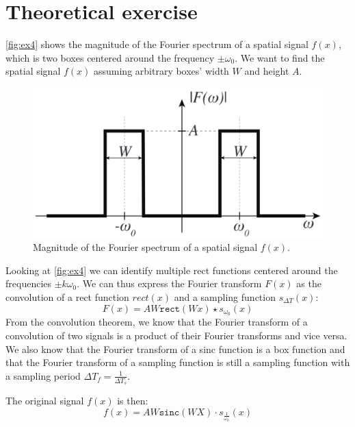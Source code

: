 \documentclass[tikz,14pt,fleqn]{article}
\begin{document}
\section{Theoretical exercise}
\autoref{fig:ex4} shows the magnitude of the Fourier spectrum of a spatial signal $f(x)$, which is two boxes centered around the frequency $±\omega_0$. We want to find the spatial signal $f(x)$ assuming arbitrary boxes' width $W$ and height $A$.

\begin{figure}[H]
    \centering
    \includegraphics[width=0.4\linewidth]{fig/4.plot.png}
    \caption{Magnitude of the Fourier spectrum of a spatial signal $f(x)$.}
    \label{fig:ex4}
\end{figure}


Looking at \autoref{fig:ex4} we can identify multiple rect functions centered around the frequencies $±k\omega_0$. We can thus express the Fourier transform $F(x)$ as the convolution of a rect function $rect(x)$ and a sampling function $s_{\Delta T}(x)$:
\begin{equation*}
    F(x) = AW\texttt{rect}(Wx) \star s_{\omega_0}(x)
\end{equation*}
From the convolution theorem, we know that the Fourier transform of a convolution of two signals is a product of their Fourier transforms and vice versa.
We also know that the Fourier transform of a sinc function is a box function and that the Fourier transform of a sampling function is still a sampling function with a sampling period $\Delta T_f = \frac{1}{\Delta T_s}$.

The original signal $f(x)$ is then:
\begin{equation*}
    f(x) = AW\texttt{sinc}(WX) \cdot s_{\frac1{\omega_0}}(x)
\end{equation*}
\end{document}
